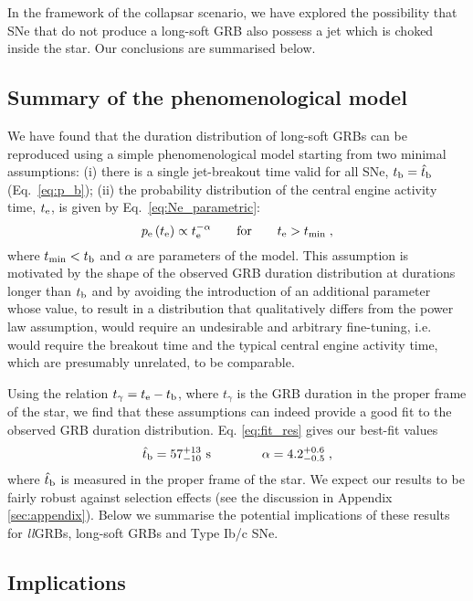 \documentclass[useAMS,usenatbib]{mn2e}
\begin{document}
In the framework of the collapsar scenario, we have explored the possibility that SNe that do not produce a long-soft GRB also possess a jet which is choked inside the star. Our conclusions are summarised below.


\subsection{Summary of the phenomenological model}

We have found that the duration distribution of long-soft GRBs can be reproduced using a simple phenomenological model starting from two minimal assumptions: (i) there is a single jet-breakout time valid for all SNe, $t_{\rm b}=\hat{t}_{\rm b}$ (Eq.~\ref{eq:p_b}); (ii) the probability distribution of the central engine activity time, $t_{\rm e}$, is given by Eq.~\eqref{eq:Ne_parametric}:
\begin{equation}
p_{\rm e}\left(t_{\rm e}\right)\propto t_{\rm e}^{-\alpha} \qquad\text{for}\qquad t_{\rm e}>t_{\rm min}\nonumber\;,
\end{equation}
where $t_{\rm min}<t_{\rm b}$ and $\alpha$ are parameters of the model. This assumption is motivated by the shape of the observed GRB duration distribution at durations longer than $t_{\rm b}$ and by avoiding the introduction of an additional parameter whose value, to result in a distribution that qualitatively differs from the power law assumption, would require an undesirable and arbitrary fine-tuning, i.e. would require the breakout time and the typical central engine activity time, which are presumably unrelated, to be comparable.

Using the relation $t_\gamma=t_{\rm e}-t_{\rm b}$, where $t_\gamma$ is the GRB duration in the proper frame of the star, we find that these assumptions can indeed provide a good fit to the observed GRB duration distribution. Eq. \eqref{eq:fit_res} gives our best-fit values
\begin{equation}
\label{eq:final}
\hat{t}_{\rm b}=57_{-10}^{+13}\text{ s} \qquad\qquad \alpha=4.2_{-0.5}^{+0.6}\nonumber\;,
\end{equation}
where $\hat{t}_{\rm b}$ is measured in the proper frame of the star. We expect our results to be fairly robust against selection effects (see the discussion in Appendix \ref{sec:appendix}). Below we summarise the potential implications of these results for {\it ll}GRBs, long-soft GRBs and Type Ib/c SNe.


\subsection{Implications}
\end{document}
